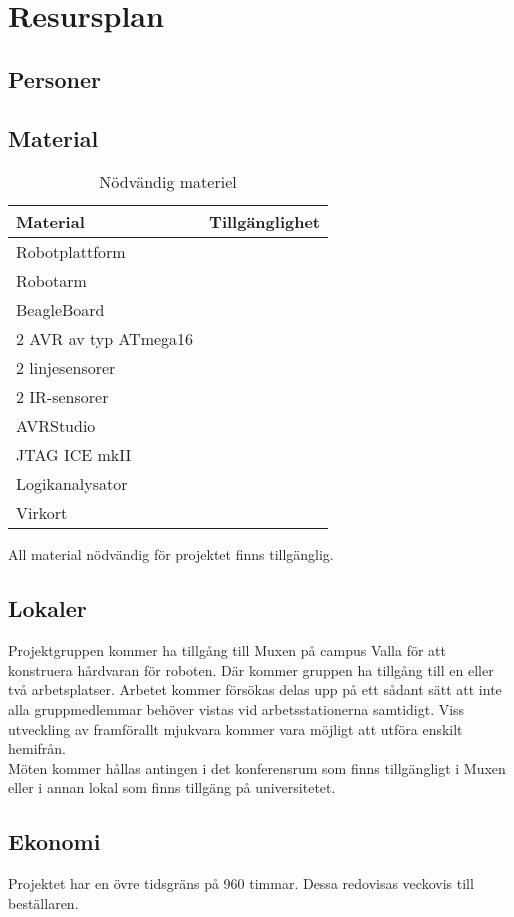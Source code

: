 \section{Resursplan}

\subsection{Personer}

\subsection{Material}
\begin{table}[h]
	\centering
		\begin{tabularx}{\textwidth}{| X | l |}
			\hline
			\textbf{Material} & \textbf{Tillgänglighet} \\
			\hline
			Robotplattform &  \\
			\hline
			Robotarm &  \\
			\hline
			BeagleBoard &  \\
			\hline
			2 AVR av typ ATmega16 &  \\
			\hline
			2 linjesensorer &  \\
			\hline
			2 IR-sensorer &  \\
			\hline
			AVRStudio &  \\
			\hline
			JTAG ICE mkII & \\
			\hline
			Logikanalysator & \\
			\hline
			Virkort & \\
			\hline

		\end{tabularx}
	\caption{Nödvändig materiel} \label{}
\end{table}

All material nödvändig för projektet finns tillgänglig.


\subsection{Lokaler}
Projektgruppen kommer ha tillgång till Muxen på campus Valla för att konstruera hårdvaran för roboten. Där kommer gruppen ha tillgång till en eller två arbetsplatser. Arbetet kommer försökas delas upp på ett sådant sätt att inte alla gruppmedlemmar behöver vistas vid arbetsstationerna samtidigt. Viss utveckling av framförallt mjukvara kommer vara möjligt att utföra enskilt hemifrån. \\
Möten kommer hållas antingen i det konferensrum som finns tillgängligt i Muxen eller i annan lokal som finns tillgäng på universitetet.

\subsection{Ekonomi}

Projektet har en övre tidsgräns på 960 timmar. Dessa redovisas veckovis till beställaren.
